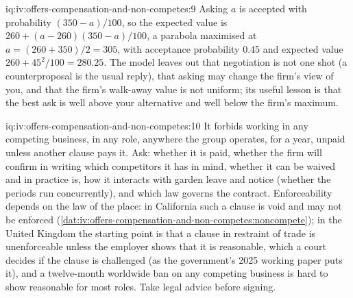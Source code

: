 \begin{solution}{iq:iv:offers-compensation-and-non-competes:9}
Asking $a$ is accepted with probability $(350 - a)/100$, so the expected value is $260 + (a - 260)(350 -
a)/100$, a parabola maximised at $a = (260 + 350)/2 = 305$, with acceptance probability 0.45 and expected
value $260 + 45^2/100 = 280.25$. The model leaves out that negotiation is not one shot (a counterproposal is the
usual reply), that asking may change the firm's view of you, and that the firm's walk-away value is not
uniform; its useful lesson is that the best ask is well above your alternative and well below the firm's
maximum.
\end{solution}

\begin{solution}{iq:iv:offers-compensation-and-non-competes:10}
It forbids working in any competing business, in any role, anywhere the group operates, for a year, unpaid
unless another clause pays it. Ask: whether it is paid, whether the firm will confirm in writing which
competitors it has in mind, whether it can be waived and in practice is, how it interacts with garden leave
and notice (whether the periods run concurrently), and which law governs the contract. Enforceability depends
on the law of the place: in California such a clause is void and may not be enforced
(\cref{dat:iv:offers-compensation-and-non-competes:noncompete}); in the United Kingdom the starting point is that a clause in restraint
of trade is unenforceable unless the employer shows that it is reasonable, which a court decides if the clause
is challenged (as the government's 2025 working paper puts it), and a twelve-month worldwide ban on any
competing business is hard to show reasonable for most roles. Take legal advice before signing.
\end{solution}
